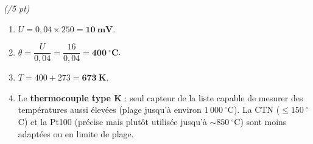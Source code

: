 \documentclass[a4paper,11pt]{article}
\begin{document}
\vspace{6pt}
 \hfill\textit{\small(/5 pt)}
\begin{enumerate}[label=\textbf{\arabic*.},leftmargin=*,itemsep=2pt]
\item $U = 0{,}04 \times 250 = \mathbf{10\ \text{mV}}$.
\item $\theta = \dfrac{U}{0{,}04} = \dfrac{16}{0{,}04} = \mathbf{400\ ^\circ\text{C}}$.
\item $T = 400 + 273 = \mathbf{673\ \text{K}}$.
\item Le \textbf{thermocouple type K} : seul capteur de la liste capable de mesurer des températures aussi élevées (plage jusqu'à environ $1\,000\ ^\circ$C). La CTN ($\leq 150\ ^\circ$C) et la Pt100 (précise mais plutôt utilisée jusqu'à $\sim 850\ ^\circ$C) sont moins adaptées ou en limite de plage.
\end{enumerate}
\end{document}
